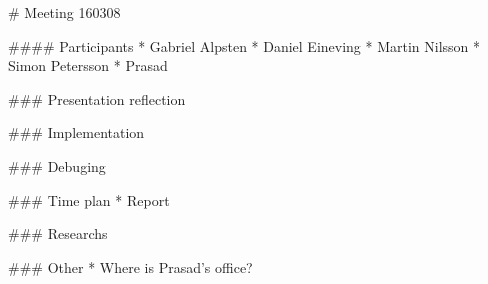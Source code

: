 # Meeting 160308

#### Participants
* Gabriel Alpsten
* Daniel Eineving
* Martin Nilsson
* Simon Petersson
* Prasad

### Presentation reflection

### Implementation

### Debuging

### Time plan
* Report

### Researchs

### Other
* Where is Prasad's office?